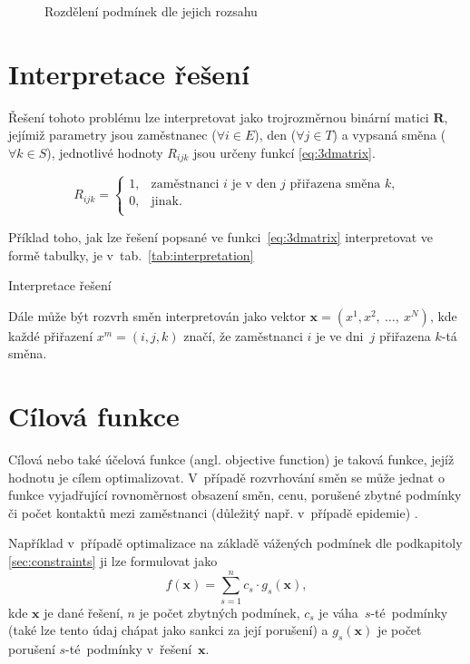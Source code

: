 \documentclass[twoside]{ctuthesis}
\begin{document}
\begin{figure}[h]
	
	\caption{Rozdělení podmínek dle jejich rozsahu}
	\label{fig:constraints}
\end{figure}


\section{Interpretace řešení}
Řešení tohoto problému lze interpretovat jako trojrozměrnou binární matici $\boldsymbol{R}$, jejímiž parametry jsou zaměstnanec ($\forall i \in E$), den ($\forall j \in T$) a vypsaná směna ($\forall k \in S$), jednotlivé hodnoty $R_{ijk}$ jsou určeny funkcí \ref{eq:3dmatrix}. \cite{vaclavik2016roster}

\begin{equation}
	\label{eq:3dmatrix}
	R_{ijk} =
	\begin{cases}
		1, & \mbox{zaměstnanci $i$ je v den $j$ přiřazena směna $k$,} \\
		0, & \mbox{jinak.}\\
	\end{cases}
\end{equation}

Příklad toho, jak lze řešení popsané ve funkci~\ref{eq:3dmatrix} interpretovat ve formě tabulky, je v~tab.~\ref{tab:interpretation}
\begin{table}[h]
	
	\caption{Interpretace řešení}
	\label{tab:interpretation}
\end{table}

Dále může být rozvrh směn interpretován jako vektor $\boldsymbol{x} = (x^1, x^2,~\ldots,~x^N)$, kde každé přiřazení $x^m = (i, j, k)$ značí, že zaměstnanci $i$ je ve dni~$j$ přiřazena $k$-tá směna. \cite{awadallah2015hybrid}

\section{Cílová funkce}
\label{sec:objective}
Cílová nebo také účelová funkce (angl. objective function) je taková funkce, jejíž hodnotu je cílem optimalizovat. V~případě rozvrhování směn se může jednat o funkce vyjadřující rovnoměrnost obsazení směn, cenu, porušené zbytné podmínky \cite{blochliger2004modeling} či počet kontaktů mezi zaměstnanci (důležitý např. v~případě epidemie) \cite{zucchi2020personnel}.

Například v~případě optimalizace na základě vážených podmínek dle podkapitoly \ref{sec:constraints} ji lze formulovat jako
\begin{equation}
	f(\boldsymbol{x}) = \sum_{s = 1}^n c_s \cdot g_s(\boldsymbol{x}),
\end{equation}
kde $\boldsymbol{x}$ je dané řešení, $n$ je počet zbytných podmínek, $c_s$ je váha~$s$-té~podmínky (také lze tento údaj chápat jako sankci za její porušení) a $g_s(\boldsymbol{x})$ je počet porušení $s$-té~podmínky v~řešení~$\boldsymbol{x}$. \cite{awadallah2015hybrid}
\end{document}
